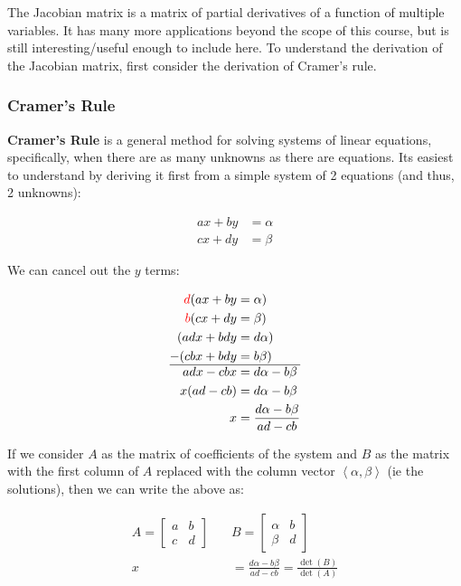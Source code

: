 \documentclass[12pt]{article}
\begin{document}
The Jacobian matrix is a matrix of partial derivatives of a function of multiple variables. It has many more applications beyond the scope of this course, but is still interesting/useful enough to include here. To understand the derivation of the Jacobian matrix, first consider the derivation of Cramer's rule.

\subsubsection{Cramer's Rule}

\textbf{Cramer's Rule} is a general method for solving systems of linear equations, specifically, when there are as many unknowns as there are equations. Its easiest to understand by deriving it first from a simple system of 2 equations (and thus, 2 unknowns):

\begin{equation}
    \begin{split}
        ax + by &= \alpha\\
        cx + dy &= \beta
    \end{split}
\end{equation}

We can cancel out the $y$ terms:

\begin{equation}
    \begin{split}
        \textcolor{red}{d}(ax + by &= \alpha)\\
        \textcolor{red}{b}(cx + dy &= \beta)\\
        (adx + bdy &= d\alpha)\\
        -(cbx + bdy &= b\beta)\\
        \hline
        adx - cbx &= d\alpha - b\beta\\
        x(ad - cb) &= d\alpha - b\beta\\
        x &= \frac{d\alpha - b\beta}{ad - cb}
    \end{split}
\end{equation}

If we consider $A$ as the matrix of coefficients of the system and $B$ as the matrix with the first column of $A$ replaced with the column vector $\left\langle \alpha, \beta \right\rangle$ (ie the solutions), then we can write the above as:

\begin{equation}
    \begin{split}
        A = \begin{bmatrix}
            a & b\\
            c & d
        \end{bmatrix}
        \quad&
        B = \begin{bmatrix}
            \alpha & b\\
            \beta & d
        \end{bmatrix}
        \quad\\
        x &= \frac{d\alpha - b\beta}{ad - cb} = \frac{\det(B)}{\det(A)}
    \end{split}
\end{equation}
\end{document}

